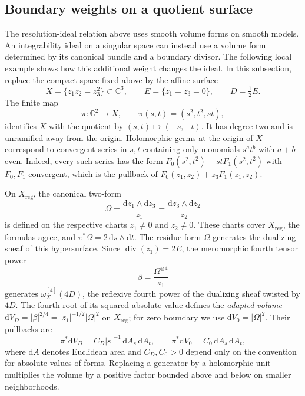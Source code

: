 \subsection{Boundary weights on a quotient surface}
\label{subsec:quotient-boundary-ideals}

The resolution-ideal relation above uses smooth volume forms on smooth models. An integrability ideal on a singular space can instead use a volume form determined by its canonical bundle and a boundary divisor. The following local example shows how this additional weight changes the ideal. In this subsection, replace the compact space fixed above by the affine surface
\[
 X=\{z_1z_2=z_3^2\}\subset\mathbb C^3,
 \qquad E=\{z_1=z_3=0\},\qquad D=\tfrac12 E.
\]
The finite map
\[
 \pi\colon\mathbb C^2\longrightarrow X,
 \qquad \pi(s,t)=(s^2,t^2,st),
\]
identifies $X$ with the quotient by $(s,t)\mapsto(-s,-t)$. It has degree two and is unramified away from the origin. Holomorphic germs at the origin of $X$ correspond to convergent series in $s,t$ containing only monomials $s^at^b$ with $a+b$ even. Indeed, every such series has the form $F_0(s^2,t^2)+stF_1(s^2,t^2)$ with $F_0,F_1$ convergent, which is the pullback of $F_0(z_1,z_2)+z_3F_1(z_1,z_2)$.

On $X_{\mathrm{reg}}$, the canonical two-form
\[
 \Omega=\frac{\mathrm{d}z_1\wedge\mathrm{d}z_3}{z_1}
       =\frac{\mathrm{d}z_3\wedge\mathrm{d}z_2}{z_2}
\]
is defined on the respective charts $z_1\neq0$ and $z_2\neq0$. These charts cover $X_{\mathrm{reg}}$, the formulas agree, and $\pi^*\Omega=2\,\mathrm{d}s\wedge\mathrm{d}t$. The residue form $\Omega$ generates the dualizing sheaf of this hypersurface. Since $\operatorname{div}(z_1)=2E$, the meromorphic fourth tensor power
\[
 \beta=\frac{\Omega^{\otimes4}}{z_1}
\]
generates $\omega_X^{[4]}(4D)$, the reflexive fourth power of the dualizing sheaf twisted by $4D$. The fourth root of its squared absolute value defines the \emph{adapted volume} $\mathrm{d}V_D=|\beta|^{2/4}=|z_1|^{-1/2}|\Omega|^2$ on $X_{\mathrm{reg}}$; for zero boundary we use $\mathrm{d}V_0=|\Omega|^2$. Their pullbacks are
\begin{equation}\label{eq:quotient-adapted-volumes}
 \pi^*\mathrm{d}V_D=C_D|s|^{-1}\,\mathrm{d}A_s\,\mathrm{d}A_t,
 \qquad
 \pi^*\mathrm{d}V_0=C_0\,\mathrm{d}A_s\,\mathrm{d}A_t,
\end{equation}
where $\mathrm{d}A$ denotes Euclidean area and $C_D,C_0>0$ depend only on the convention for absolute values of forms. Replacing a generator by a holomorphic unit multiplies the volume by a positive factor bounded above and below on smaller neighborhoods.

